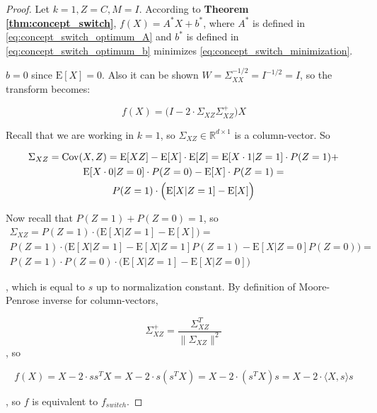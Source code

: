 \begin{proof}
    Let $k=1, Z=C, M=I$. According to \textbf{Theorem \ref{thm:concept_switch}}, $f(X) = A^* X + b^*$, where $A^*$ is defined in \eqref{eq:concept_switch_optimum_A} and $b^*$ is defined in \eqref{eq:concept_switch_optimum_b} minimizes \eqref{eq:concept_switch_minimization}. 

    $b=0$ since $\mathrm{E}[X] = 0$. Also it can be shown $W = \Sigma_{XX}^{-1/2} = I^{-1/2} = I$, so the transform becomes:

    \begin{equation}
        f(X) = \Big(I - 2 \cdot \Sigma_{XZ} \Sigma_{XZ}^+\Big) X
    \end{equation}

    Recall that we are working in $k = 1$, so $\Sigma_{XZ} \in \mathbb{R}^{d \times 1}$ is a column-vector. So 

    \begin{multline*}
        \Sigma_{XZ} = \mathrm{Cov}(X, Z) = \mathrm{E}[XZ] - \mathrm{E}[X] \cdot \mathrm{E}[Z] = \mathrm{E}[X \cdot 1 | Z = 1] \cdot P(Z = 1) + \\
        \mathrm{E}[X \cdot 0 | Z = 0] \cdot P(Z = 0) - \mathrm{E}[X] \cdot P(Z = 1) = \\
        P(Z=1) \cdot \Big(\mathrm{E}[X | Z = 1] - \mathrm{E}[X]\Big)
    \end{multline*}

Now recall that $P(Z=1) + P(Z=0) = 1$, so
    \begin{multline*}
        \Sigma_{XZ} = 
        P(Z=1) \cdot \Big(\mathrm{E}[X | Z = 1] - \mathrm{E}[X]\Big) = \\
        P(Z=1) \cdot \Big(\mathrm{E}[X | Z = 1] - \mathrm{E}[X | Z = 1] P(Z=1) - \mathrm{E}[X | Z = 0] P(Z=0)\Big) = \\
        P(Z=1) \cdot P(Z=0) \cdot \Big(\mathrm{E}[X | Z = 1] - \mathrm{E}[X | Z = 0] \Big)
    \end{multline*}

, which is equal to $s$ up to normalization constant. By definition of Moore-Penrose inverse for column-vectors,

\begin{equation*}
    \Sigma_{XZ}^+ = \frac{\Sigma_{XZ}^T}{\lVert{\Sigma_{XZ}}\rVert^2} 
\end{equation*}, so

\begin{equation*}
    f(X) = X - 2 \cdot s s^T X = X - 2 \cdot s (s^T X) = X - 2 \cdot(s^T X) s = X - 2 \cdot \langle X, s \rangle s
\end{equation*}

, so $f$ is equivalent to $f_{switch}$.
    
\end{proof}


